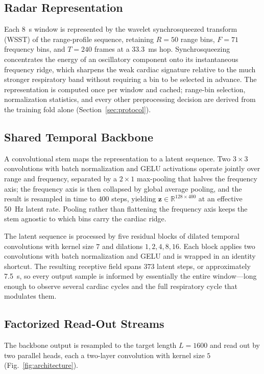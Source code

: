 \documentclass[lettersize,journal]{IEEEtran}
\begin{document}
\subsection{Radar Representation}
Each \SI{8}{\second} window is represented by the wavelet synchrosqueezed transform (WSST) of the range-profile sequence, retaining $R = 50$ range bins, $F = 71$ frequency bins, and $T = 240$ frames at a \SI{33.3}{\milli\second} hop. Synchrosqueezing concentrates the energy of an oscillatory component onto its instantaneous frequency ridge, which sharpens the weak cardiac signature relative to the much stronger respiratory band without requiring a bin to be selected in advance. The representation is computed once per window and cached; range-bin selection, normalization statistics, and every other preprocessing decision are derived from the training fold alone (Section~\ref{sec:protocol}).

\subsection{Shared Temporal Backbone}
A convolutional stem maps the representation to a latent sequence. Two $3\!\times\!3$ convolutions with batch normalization and GELU activations operate jointly over range and frequency, separated by a $2\!\times\!1$ max-pooling that halves the frequency axis; the frequency axis is then collapsed by global average pooling, and the result is resampled in time to $400$ steps, yielding $\mathbf{z} \in \mathbb{R}^{128 \times 400}$ at an effective \SI{50}{\hertz} latent rate. Pooling rather than flattening the frequency axis keeps the stem agnostic to which bins carry the cardiac ridge.

The latent sequence is processed by five residual blocks of dilated temporal convolutions with kernel size $7$ and dilations $1, 2, 4, 8, 16$. Each block applies two convolutions with batch normalization and GELU and is wrapped in an identity shortcut. The resulting receptive field spans $373$ latent steps, or approximately \SI{7.5}{\second}, so every output sample is informed by essentially the entire window---long enough to observe several cardiac cycles and the full respiratory cycle that modulates them.

\subsection{Factorized Read-Out Streams}
The backbone output is resampled to the target length $L = 1600$ and read out by two parallel heads, each a two-layer convolution with kernel size $5$ (Fig.~\ref{fig:architecture}).
\end{document}
